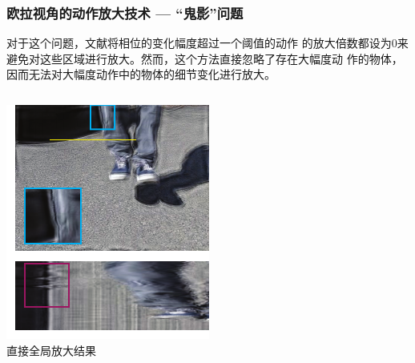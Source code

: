 \documentclass[xcolor=svgnames,serif,table,10pt]{beamer}
\begin{document}
\begin{frame}
  \frametitle{欧拉视角的动作放大技术 --- “鬼影”问题}
  \small
  
  对于这个问题，文献\cite{Wadhwa2013PhaseBased}将相位的变化幅度超过一个阈值的动作
  的放大倍数都设为0来避免对这些区域进行放大。然而，这个方法直接忽略了存在大幅度动
  作的物体，因而无法对大幅度动作中的物体的细节变化进行放大。

  \medskip
  \begin{columns}
    \small
    \raggedleft
    \begin{minipage}{0.7\textwidth}
      \centering
      \includegraphics[width=\textwidth]{ignore.pdf}\\
      直接全局放大结果
    \end{minipage}
    \begin{minipage}{0.7\textwidth}
      \centering

\end{minipage}
\end{columns}
\end{frame}
\end{document}
